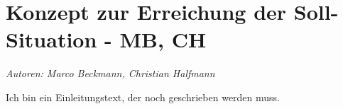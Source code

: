 \chapter{Konzept zur Erreichung der Soll-Situation - MB, CH}

\textit{Autoren: Marco Beckmann, Christian Halfmann}

Ich bin ein Einleitungstext, der noch geschrieben werden muss.






